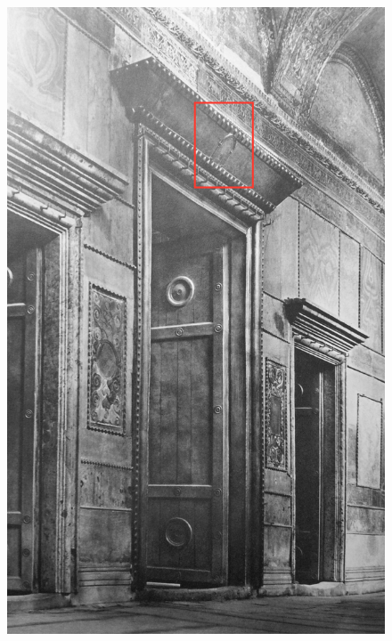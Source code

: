 \documentclass[amsthm,ebook]{saparticle}
\begin{document}
\begin{figure}[!bp]
\centering
\begin{minipage}[c]{0.42\textwidth}
 \includegraphics[width=\columnwidth]{FelleVisualFeaturesofinscriptionsEAGLE2016FullPaper-img012.jpg}
\end{minipage}
\begin{minipage}[c]{0.57\textwidth}

\end{minipage}
\end{figure}
\end{document}

